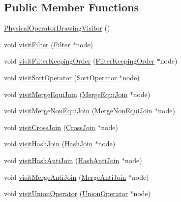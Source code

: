\subsection*{Public Member Functions}
\begin{DoxyCompactItemize}
\item 
\hyperlink{class_physical_operator_drawing_visitor_a2168858696bd1ce675cef6b895fe995b}{Physical\+Operator\+Drawing\+Visitor} ()
\item 
void \hyperlink{class_physical_operator_drawing_visitor_af5a712a2a8dac447846849d91d20821e}{visit\+Filter} (\hyperlink{class_filter}{Filter} $\ast$node)
\item 
void \hyperlink{class_physical_operator_drawing_visitor_a0e517a5b635ad9dd2624ca2ac5f623e6}{visit\+Filter\+Keeping\+Order} (\hyperlink{class_filter_keeping_order}{Filter\+Keeping\+Order} $\ast$node)
\item 
void \hyperlink{class_physical_operator_drawing_visitor_af0aaa68b27e6e562744b0c8211a63b9a}{visit\+Sort\+Operator} (\hyperlink{class_sort_operator}{Sort\+Operator} $\ast$node)
\item 
void \hyperlink{class_physical_operator_drawing_visitor_a78f01a744a33b84011ddedca236e95e1}{visit\+Merge\+Equi\+Join} (\hyperlink{class_merge_equi_join}{Merge\+Equi\+Join} $\ast$node)
\item 
void \hyperlink{class_physical_operator_drawing_visitor_acdfdd3b9f711abff9fb064495e8512e1}{visit\+Merge\+Non\+Equi\+Join} (\hyperlink{class_merge_non_equi_join}{Merge\+Non\+Equi\+Join} $\ast$node)
\item 
void \hyperlink{class_physical_operator_drawing_visitor_aaeb9fbec796677a5483384cbddd3f827}{visit\+Cross\+Join} (\hyperlink{class_cross_join}{Cross\+Join} $\ast$node)
\item 
void \hyperlink{class_physical_operator_drawing_visitor_a22032e2685059a3221b85bc990fe684e}{visit\+Hash\+Join} (\hyperlink{class_hash_join}{Hash\+Join} $\ast$node)
\item 
void \hyperlink{class_physical_operator_drawing_visitor_a1825f8934ad3c2267a40a599b13d2a1a}{visit\+Hash\+Anti\+Join} (\hyperlink{class_hash_anti_join}{Hash\+Anti\+Join} $\ast$node)
\item 
void \hyperlink{class_physical_operator_drawing_visitor_ab47caea2d0f82662947a0bf7087e0514}{visit\+Merge\+Anti\+Join} (\hyperlink{class_merge_anti_join}{Merge\+Anti\+Join} $\ast$node)
\item 
void \hyperlink{class_physical_operator_drawing_visitor_aeaa1cd49533ed1bb74921262b918bb06}{visit\+Union\+Operator} (\hyperlink{class_union_operator}{Union\+Operator} $\ast$node)

\end{DoxyCompactItemize}
